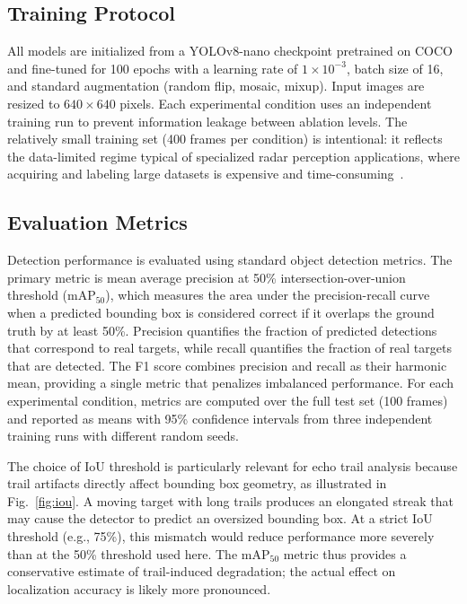 \documentclass[colorlinks,upint,balance]{asmeconf}
\begin{document}
\subsection{Training Protocol}

All models are initialized from a YOLOv8-nano checkpoint pretrained on COCO and fine-tuned for 100 epochs with a learning rate of $1 \times 10^{-3}$, batch size of 16, and standard augmentation (random flip, mosaic, mixup). Input images are resized to $640 \times 640$ pixels. Each experimental condition uses an independent training run to prevent information leakage between ablation levels. The relatively small training set (400 frames per condition) is intentional: it reflects the data-limited regime typical of specialized radar perception applications, where acquiring and labeling large datasets is expensive and time-consuming~\cite{Shorten2019DataAugmentation}.

\subsection{Evaluation Metrics}

Detection performance is evaluated using standard object detection metrics. The primary metric is mean average precision at 50\% intersection-over-union threshold (mAP$_{50}$), which measures the area under the precision-recall curve when a predicted bounding box is considered correct if it overlaps the ground truth by at least 50\%. Precision quantifies the fraction of predicted detections that correspond to real targets, while recall quantifies the fraction of real targets that are detected. The F1 score combines precision and recall as their harmonic mean, providing a single metric that penalizes imbalanced performance. For each experimental condition, metrics are computed over the full test set (100 frames) and reported as means with 95\% confidence intervals from three independent training runs with different random seeds.

The choice of IoU threshold is particularly relevant for echo trail analysis because trail artifacts directly affect bounding box geometry, as illustrated in Fig.~\ref{fig:iou}. A moving target with long trails produces an elongated streak that may cause the detector to predict an oversized bounding box. At a strict IoU threshold (e.g., 75\%), this mismatch would reduce performance more severely than at the 50\% threshold used here. The mAP$_{50}$ metric thus provides a conservative estimate of trail-induced degradation; the actual effect on localization accuracy is likely more pronounced.
\end{document}
